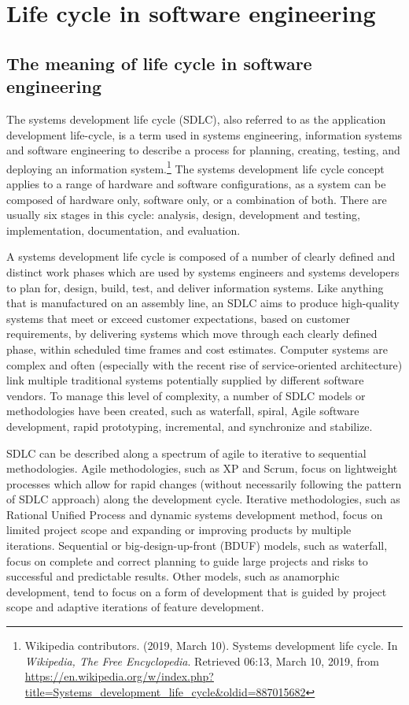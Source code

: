 \documentclass[a4paper]{report}
\begin{document}
\section{Life cycle in software engineering}
\subsection{The meaning of life cycle in software engineering}
The systems development life cycle (SDLC), also referred to as the application development life-cycle, is a term used in systems engineering, information systems and software engineering to describe a process for planning, creating, testing, and deploying an information system.\footnote{Wikipedia contributors. (2019, March 10). Systems development life cycle. In \emph{Wikipedia, The Free Encyclopedia}. Retrieved 06:13, March 10, 2019, from \url{https://en.wikipedia.org/w/index.php?title=Systems_development_life_cycle&oldid=887015682}} The systems development life cycle concept applies to a range of hardware and software configurations, as a system can be composed of hardware only, software only, or a combination of both. There are usually six stages in this cycle: analysis, design, development and testing, implementation, documentation, and evaluation.
\par
A systems development life cycle is composed of a number of clearly defined and distinct work phases which are used by systems engineers and systems developers to plan for, design, build, test, and deliver information systems. Like anything that is manufactured on an assembly line, an SDLC aims to produce high-quality systems that meet or exceed customer expectations, based on customer requirements, by delivering systems which move through each clearly defined phase, within scheduled time frames and cost estimates. Computer systems are complex and often (especially with the recent rise of service-oriented architecture) link multiple traditional systems potentially supplied by different software vendors. To manage this level of complexity, a number of SDLC models or methodologies have been created, such as waterfall, spiral, Agile software development, rapid prototyping, incremental, and synchronize and stabilize.
\par
SDLC can be described along a spectrum of agile to iterative to sequential methodologies. Agile methodologies, such as XP and Scrum, focus on lightweight processes which allow for rapid changes (without necessarily following the pattern of SDLC approach) along the development cycle. Iterative methodologies, such as Rational Unified Process and dynamic systems development method, focus on limited project scope and expanding or improving products by multiple iterations. Sequential or big-design-up-front (BDUF) models, such as waterfall, focus on complete and correct planning to guide large projects and risks to successful and predictable results. Other models, such as anamorphic development, tend to focus on a form of development that is guided by project scope and adaptive iterations of feature development.
\end{document}
